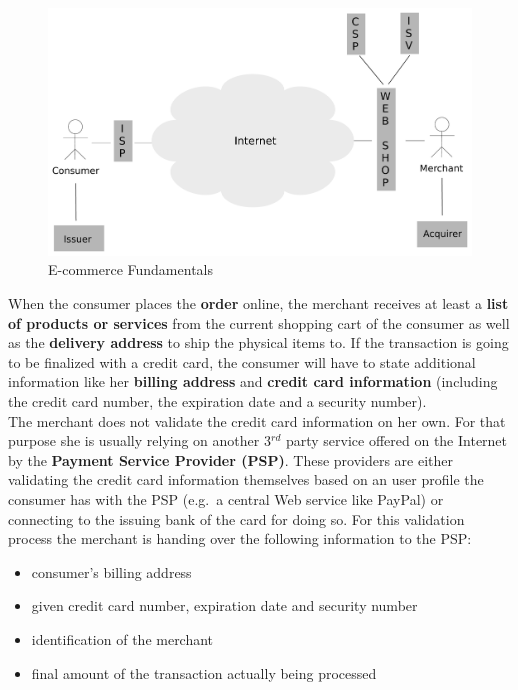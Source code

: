 \begin{figure}[H]
	\centering
		\includegraphics[width=0.8\columnwidth]{images/e-commerce-scenario.pdf}
	\caption{E-commerce Fundamentals}
\label{fig:images_ecommerce_scenario}
\end{figure}

When the consumer places the \textbf{order} online, the merchant receives at least a \textbf{list of products or services} from the current shopping cart of the consumer as well as the \textbf{delivery address} to ship the physical items to. If the transaction is going to be finalized with a credit card, the consumer will have to state additional information like her \textbf{billing address} and \textbf{credit card information} (including the credit card number, the expiration date and a security number). \\
The merchant does not validate the credit card information on her own. For that purpose she is usually relying on another 3$^{rd}$ party service offered on the Internet by the \textbf{Payment Service Provider (PSP)}. These providers are either validating the credit card information themselves based on an user profile the consumer has with the PSP (e.g.\ a central Web service like PayPal) or connecting to the issuing bank of the card for doing so. For this validation process the merchant is handing over the following information to the PSP:\@

\begin{itemize}
    \item consumer's billing address
    \item given credit card number, expiration date and security number
    \item identification of the merchant
    \item final amount of the transaction actually being processed
\end{itemize}


